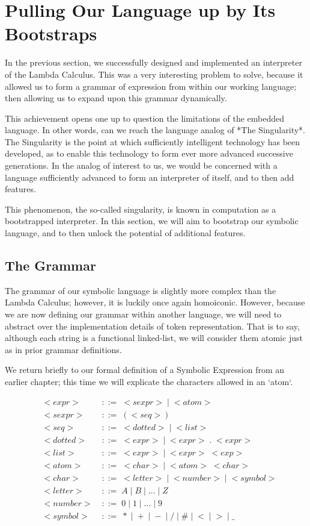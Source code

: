 
\chapter{Pulling Our Language up by Its Bootstraps}
In the previous section, we successfully designed and implemented an
interpreter of the Lambda Calculus. This was a very interesting problem to
solve, because it allowed us to form a grammar of expression from within our working language; then allowing us to expand upon this grammar dynamically.

This achievement opens one up to question the limitations of the embedded
language. In other words, can we reach the language analog of *The 
Singularity*. The Singularity is the point at which sufficiently intelligent 
technology has been developed, as to enable this technology to form ever more 
advanced successive generations. In the analog of interest to us, we would be 
concerned with a language sufficiently advanced to form an interpreter of 
itself, and to then add features.

This phenomenon, the so-called singularity, is known in computation as a 
bootstrapped interpreter. In this section, we will aim to bootstrap our 
symbolic language, and to then unlock the potential of additional features.

\section{The Grammar}
The grammar of our symbolic language is slightly more complex than the Lambda 
Calculus; however, it is luckily once again homoiconic. However, because we 
are now defining our grammar within another language, we will need to 
abstract over the implementation details of token representation. That is to 
say, although each string is a functional linked-list, we will consider them 
atomic just as in prior grammar definitions.

We return briefly to our formal definition of a Symbolic Expression from an 
earlier chapter; this time we will explicate the characters allowed in an 
`atom`.

\begin{align*}
& <expr> \; &::= \; <sexpr> \; | \; <atom>
\\& <sexpr> \; &::= \; (<seq>)
\\& <seq> \; &::= \; <dotted> \; | \; <list>
\\& <dotted> \; &::= \; <expr> \; | \; <expr> \; . \; <expr>
\\& <list> \; &::= \; <expr> \; | \; <expr> \; <exp>
\\& <atom> \; &::= \; <char> \; | \; <atom> \; <char>
\\& <char> \; &::= \; <letter> \; | \; <number> \; | \; <symbol>
\\& <letter> \; &::= \; A \; | \; B \; | \; \dots \; | \; Z
\\& <number> \; &::= \; 0 \; | \; 1 \; | \; \dots \; | \; 9
\\& <symbol> \; &::= \; * \; | \; + \; | \; - \; | \; / \; | \; \# \; | \; < \; | \; > \; | \; \_
\end{align*}

